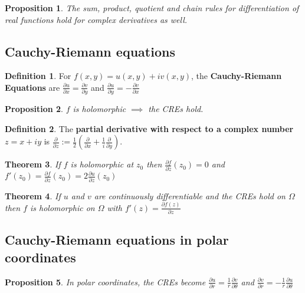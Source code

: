 \documentclass[12pt]{article}
\newtheorem{thm}{Theorem}[section]
\newtheorem{prop}[thm]{Proposition}
\theoremstyle{definition}
\newtheorem{defn}{Definition}[section]
\begin{document}
\begin{prop}
  The sum, product, quotient and chain rules for differentiation of real functions hold for complex derivatives as well.
\end{prop}

\subsection{Cauchy-Riemann equations}

\begin{defn}
  For $f(x, y) = u(x, y) + iv(x, y)$, the \textbf{Cauchy-Riemann Equations} are $\frac{\partial u}{\partial x} = \frac{\partial v}{\partial y}$ and $\frac{\partial u}{\partial y} = -\frac{\partial v}{\partial x}$
\end{defn}

\begin{prop}
  $f$ is holomorphic $\implies$ the CREs hold.
\end{prop}

\begin{defn}
  The \textbf{partial derivative with respect to a complex number} $z = x + iy$ is $\frac{\partial}{\partial z} := \frac{1}{2}\left(\frac{\partial}{\partial x} + \frac{1}{i}\frac{\partial}{\partial y}\right)$.
\end{defn}

\begin{thm}
  If $f$ is holomorphic at $z_0$ then $\frac{\partial f}{\partial \overline{z}}(z_0) = 0$ and $f'(z_0) = \frac{\partial f}{\partial z}(z_0) = 2\frac{\partial u}{\partial z}(z_0)$
\end{thm}

\begin{thm}
  If $u$ and $v$ are continuously differentiable and the CREs hold on $\Omega$ then $f$ is holomorphic on $\Omega$ with $f'(z) = \frac{\partial f(z)}{\partial z}$
\end{thm}


\subsection{Cauchy-Riemann equations in polar coordinates}

\begin{prop}
  In polar coordinates, the CREs become $\frac{\partial u}{\partial r} = \frac{1}{r}\frac{\partial v}{\partial \theta}$ and $\frac{\partial v}{\partial r} = -\frac{1}{r}\frac{\partial u}{\partial \theta}$
\end{prop}
\end{document}
